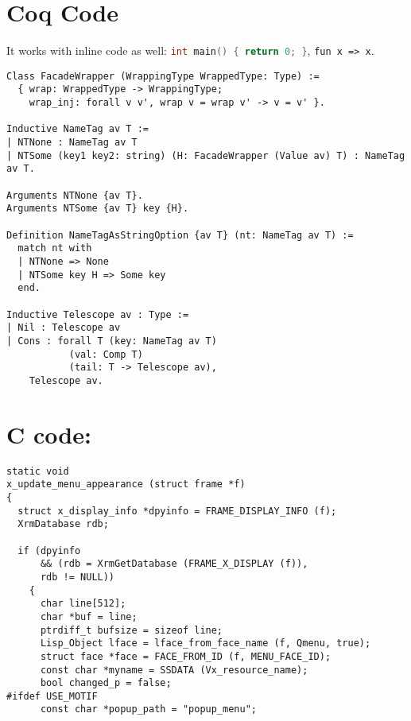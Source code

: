 \documentclass{article}
\def\coqverb{\verb}
\def\cverb{\lstinline[language=c]}
\begin{document}
\section*{Coq Code}

It works with inline code as well: \cverb|int main() { return 0; }|, \coqverb|fun x => x|.

\begin{verbatim}
Class FacadeWrapper (WrappingType WrappedType: Type) :=
  { wrap: WrappedType -> WrappingType;
    wrap_inj: forall v v', wrap v = wrap v' -> v = v' }.

Inductive NameTag av T :=
| NTNone : NameTag av T
| NTSome (key1 key2: string) (H: FacadeWrapper (Value av) T) : NameTag av T.

Arguments NTNone {av T}.
Arguments NTSome {av T} key {H}.

Definition NameTagAsStringOption {av T} (nt: NameTag av T) :=
  match nt with
  | NTNone => None
  | NTSome key H => Some key
  end.

Inductive Telescope av : Type :=
| Nil : Telescope av
| Cons : forall T (key: NameTag av T)
           (val: Comp T)
           (tail: T -> Telescope av),
    Telescope av.
\end{verbatim}

\section*{C code:}
\begin{verbatim}
static void
x_update_menu_appearance (struct frame *f)
{
  struct x_display_info *dpyinfo = FRAME_DISPLAY_INFO (f);
  XrmDatabase rdb;

  if (dpyinfo
      && (rdb = XrmGetDatabase (FRAME_X_DISPLAY (f)),
      rdb != NULL))
    {
      char line[512];
      char *buf = line;
      ptrdiff_t bufsize = sizeof line;
      Lisp_Object lface = lface_from_face_name (f, Qmenu, true);
      struct face *face = FACE_FROM_ID (f, MENU_FACE_ID);
      const char *myname = SSDATA (Vx_resource_name);
      bool changed_p = false;
#ifdef USE_MOTIF
      const char *popup_path = "popup_menu";
\end{verbatim}
\end{document}
